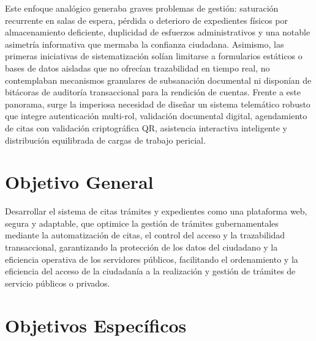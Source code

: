 Este enfoque analógico generaba graves problemas de gestión: saturación recurrente en salas de espera, pérdida o deterioro de expedientes físicos por almacenamiento deficiente, duplicidad de esfuerzos administrativos y una notable asimetría informativa que mermaba la confianza ciudadana. Asimismo, las primeras iniciativas de sistematización solían limitarse a formularios estáticos o bases de datos aisladas que no ofrecían trazabilidad en tiempo real, no contemplaban mecanismos granulares de subsanación documental ni disponían de bitácoras de auditoría transaccional para la rendición de cuentas. Frente a este panorama, surge la imperiosa necesidad de diseñar un sistema telemático robusto que integre autenticación multi-rol, validación documental digital, agendamiento de citas con validación criptográfica QR, asistencia interactiva inteligente y distribución equilibrada de cargas de trabajo pericial.

\section{Objetivo General}

Desarrollar el sistema de citas trámites y expedientes como una plataforma web, segura y adaptable, que optimice la gestión de trámites gubernamentales mediante la automatización de citas, el control del acceso y la trazabilidad transaccional, garantizando la protección de los datos del ciudadano y la eficiencia operativa de los servidores públicos, facilitando el ordenamiento y la eficiencia del acceso de la ciudadanía a la realización y gestión de trámites de servicio públicos o privados.

\section{Objetivos Específicos}

